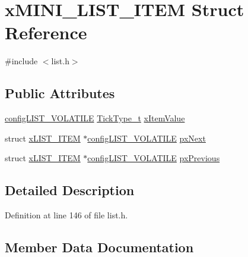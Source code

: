 \hypertarget{structx_m_i_n_i___l_i_s_t___i_t_e_m}{}\section{x\+M\+I\+N\+I\+\_\+\+L\+I\+S\+T\+\_\+\+I\+T\+EM Struct Reference}
\label{structx_m_i_n_i___l_i_s_t___i_t_e_m}


{\ttfamily \#include $<$list.\+h$>$}

\subsection*{Public Attributes}
\begin{DoxyCompactItemize}
\item 
\hyperlink{list_8h_a2d5de557c5561c8980d1bf51d87d8cba}{config\+L\+I\+S\+T\+\_\+\+V\+O\+L\+A\+T\+I\+LE} \hyperlink{_g_c_c_2_a_r_m___c_m3_2portmacro_8h_aa69c48c6e902ce54f70886e6573c92a9}{Tick\+Type\+\_\+t} \hyperlink{structx_m_i_n_i___l_i_s_t___i_t_e_m_a0d87493ffe2e7ff2e3218262e57826c9}{x\+Item\+Value}
\item 
struct \hyperlink{structx_l_i_s_t___i_t_e_m}{x\+L\+I\+S\+T\+\_\+\+I\+T\+EM} $\ast$\hyperlink{list_8h_a2d5de557c5561c8980d1bf51d87d8cba}{config\+L\+I\+S\+T\+\_\+\+V\+O\+L\+A\+T\+I\+LE} \hyperlink{structx_m_i_n_i___l_i_s_t___i_t_e_m_aa7ae770b0f10daeb9ac76c6f7dd5608e}{px\+Next}
\item 
struct \hyperlink{structx_l_i_s_t___i_t_e_m}{x\+L\+I\+S\+T\+\_\+\+I\+T\+EM} $\ast$\hyperlink{list_8h_a2d5de557c5561c8980d1bf51d87d8cba}{config\+L\+I\+S\+T\+\_\+\+V\+O\+L\+A\+T\+I\+LE} \hyperlink{structx_m_i_n_i___l_i_s_t___i_t_e_m_a732c666bb97560eb1b094a2c411269ab}{px\+Previous}
\end{DoxyCompactItemize}


\subsection{Detailed Description}


Definition at line 146 of file list.\+h.



\subsection{Member Data Documentation}
